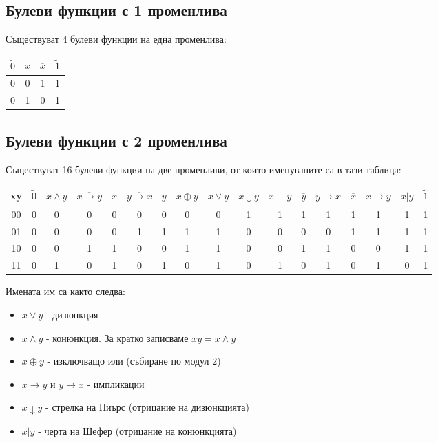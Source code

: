 \documentclass[fleqn,12pt]{article}
\begin{document}
\begin{flushleft}
\subsection{Булеви функции с 1 променлива}
Съществуват 4 булеви функции на една променлива:
\begin{center}
\begin{tabular}{ |c|c|c|c| } 
    \hline
    $\widetilde{0}$ & $x$ & $\overline{x}$ & $\widetilde{1}$ \\ 
    \hline
    0 & 0 & 1 & 1 \\ 
    0 & 1 & 0 & 1 \\ 
    \hline
\end{tabular}
\end{center}

\subsection{Булеви функции с 2 променлива}
Съществуват 16 булеви функции на две променливи, от които именуваните са в тази таблица:
\begin{center}
\begin{tabular}{ |c|c|c|c|c|c|c|c|c|c|c|c|c|c|c|c|c| } 
    \hline
    xy & $\widetilde{0}$ & $x \wedge y$ & $\overline{x \rightarrow y}$  & $x$ & $\overline{y \rightarrow x}$ & $y$ & $x \oplus y$ & $x \vee y$ & $x \downarrow y$ & $x \equiv y$ & $\overline{y}$ & $y \rightarrow x$ & $\overline{x}$ & $x \rightarrow y$ & $x | y$ & $\widetilde{1}$ \\ 
    \hline
    00 & 0 & 0 & 0 & 0 & 0 & 0 & 0 & 0 & 1 & 1 & 1 & 1 & 1 & 1 & 1 & 1 \\ 
    01 & 0 & 0 & 0 & 0 & 1 & 1 & 1 & 1 & 0 & 0 & 0 & 0 & 1 & 1 & 1 & 1\\ 
    10 & 0 & 0 & 1 & 1 & 0 & 0 & 1 & 1 & 0 & 0 & 1 & 1 & 0 & 0 & 1 & 1\\ 
    11 & 0 & 1 & 0 & 1 & 0 & 1 & 0 & 1 & 0 & 1 & 0 & 1 & 0 & 1 & 0 & 1\\ 
    \hline
\end{tabular}
\end{center}
Имената им са както следва:
\begin{itemize}
    \item $x \vee y$ - дизюнкция
    \item $x \wedge y$ - конюнкция. За кратко записваме $xy = x \wedge y$
    \item $x \oplus y$ - изключващо или (събиране по модул 2)
    \item $x \rightarrow y$ и $y \rightarrow x$ - импликации
    \item $x \downarrow y$ - стрелка на Пиърс (отрицание на дизюнкцията)
    \item $x|y$ - черта на Шефер (отрицание на конюнкцията)
\end{itemize}


\end{flushleft}
\end{document}
